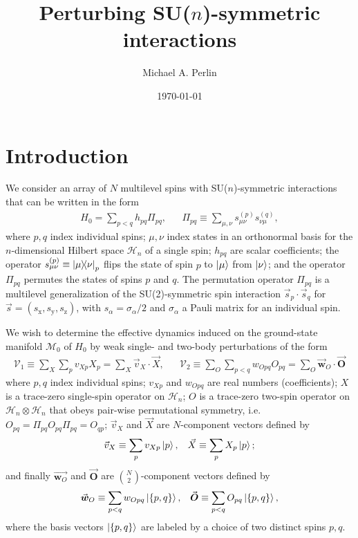 \documentclass[nofootinbib,notitlepage,11pt]{revtex4-2}
\newcommand{\p}[1]{\left(#1\right)} %
\renewcommand{\set}[1]{\left\{#1\right\}} %
\renewcommand{\c}{\cdot} %
\newcommand{\m}{\bm} %
\renewcommand{\v}{\vec} %
\newcommand{\1}{\mathds{1}}
\newcommand{\x}{\text{x}}
\newcommand{\y}{\text{y}}
\newcommand{\z}{\text{z}}
\renewcommand{\H}{\mathcal{H}}
\newcommand{\M}{\mathcal{M}}
\newcommand{\V}{\mathcal{V}}
\begin{document}
\title{Perturbing SU($n$)-symmetric interactions}%
\author{Michael A. Perlin}%
\date{\today}

\maketitle

\tableofcontents

\section{Introduction}

We consider an array of $N$ multilevel spins with SU($n$)-symmetric
interactions that can be written in the form
\begin{align}
  H_0 = \sum_{p<q} h_{pq} \Pi_{pq},
  &&
  \Pi_{pq} \equiv \sum_{\mu,\nu} s_{\mu\nu}^{(p)} s_{\nu\mu}^{(q)},
  \label{eq:H_0}
\end{align}
where $p,q$ index individual spins; $\mu,\nu$ index states in an
orthonormal basis for the $n$-dimensional Hilbert space $\H_n$ of a
single spin; $h_{pq}$ are scalar coefficients; the operator
$s_{\mu\nu}^{(p)}\equiv\op{\mu}{\nu}_p$ flips the state of spin $p$ to
$\ket\mu$ from $\ket\nu$; and the operator $\Pi_{pq}$ permutes the
states of spins $p$ and $q$.  The permutation operator $\Pi_{pq}$ is a
multilevel generalization of the SU(2)-symmetric spin interaction
$\v s_p\c\v s_q$ for $\v s=\p{s_\x,s_\y,s_\z}$, with
$s_\alpha=\sigma_\alpha/2$ and $\sigma_\alpha$ a Pauli matrix for an
individual spin.

We wish to determine the effective dynamics induced on the
ground-state manifold $\M_0$ of $H_0$ by weak single- and two-body
perturbations of the form
\begin{align}
  \V_1 \equiv \sum_X \sum_p v_{Xp} X_p = \sum_X \v v_X\c\v X,
  &&
  \V_2 \equiv \sum_O \sum_{p<q} w_{Opq} O_{pq}
  = \sum_O \v{\m w}_O\c \v{\m O}
  \label{eq:perturbations}
\end{align}
where $p,q$ index individual spins; $v_{Xp}$ and $w_{Opq}$ are real
numbers (coefficients); $X$ is a trace-zero single-spin operator on
$\H_n$; $O$ is a trace-zero two-spin operator on $\H_n\otimes\H_n$
that obeys pair-wise permutational symmetry,
i.e.~$O_{pq} = \Pi_{pq} O_{pq} \Pi_{pq} = O_{qp}$; $\v v_X$ and $\v X$
are $N$-component vectors defined by
\begin{align}
  \v v_X \equiv \sum_p v_{Xp} \ket{p},
  &&
  \v X \equiv \sum_p X_p \ket{p};
\end{align}
and finally $\v{\m w_O}$ and $\v{\m O}$ are ${N \choose 2}$-component
vectors defined by
\begin{align}
  \v{\m w}_O \equiv \sum_{p<q} w_{Opq} \ket{\set{p,q}},
  &&
  \v{\m O} \equiv \sum_{p<q} O_{pq} \ket{\set{p,q}},
\end{align}
where the basis vectors $\ket{\set{p,q}}$ are labeled by a choice of
two distinct spins $p,q$.
\end{document}
